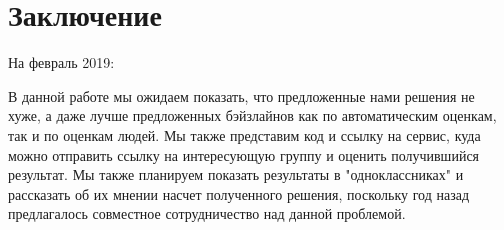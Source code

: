 \documentclass[aps,%
12pt,%
final,%
oneside,
onecolumn,%
musixtex, %
superscriptaddress,%
centertags]{article} %
\begin{document}
\section{Заключение}
На февраль 2019:

В данной работе мы ожидаем показать, что предложенные нами решения не хуже,
а даже лучше предложенных бэйзлайнов как по автоматическим оценкам, так и по оценкам
людей. Мы также представим код и ссылку на сервис, куда можно отправить ссылку на
интересующую группу и оценить получившийся результат. Мы также планируем показать
результаты в "одноклассниках" и рассказать об их мнении насчет полученного решения,
поскольку год назад предлагалось совместное сотрудничество над данной проблемой.



\end{document}
